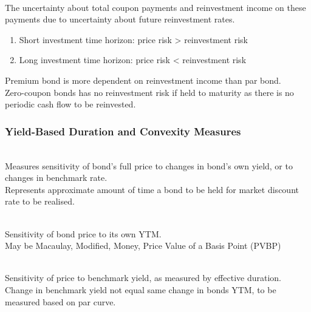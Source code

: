 \begin{definition} \\
The uncertainty about total coupon payments and reinvestment income on these payments due to uncertainty about future reinvestment rates.
\end{definition}

\begin{remark} 
\begin{enumerate}[label=\roman*.]
\setlength{\itemsep}{0pt}
\item Short investment time horizon: price risk > reinvestment risk
\item Long investment time horizon: price risk < reinvestment risk
\end{enumerate}
Premium bond is more dependent on reinvestment income than par bond.\\
Zero-coupon bonds has no reinvestment risk if held to maturity as there is no periodic cash flow to be reinvested.
\end{remark}

\subsubsection{Yield-Based Duration and Convexity Measures}

\begin{definition} \\
Measures sensitivity of bond’s full price to changes in bond’s own yield, or to changes in benchmark rate.\\
Represents approximate amount of time a bond to be held for market discount rate to be realised.
\end{definition}

\begin{definition} \\
Sensitivity of bond price to its own YTM.\\
May be Macaulay, Modified, Money, Price Value of a Basis Point (PVBP)
\end{definition}

\begin{definition} \\
Sensitivity of price to benchmark yield, as measured by effective duration.\\
Change in benchmark yield not equal same change in bonds YTM, to be measured based on par curve.
\end{definition}

